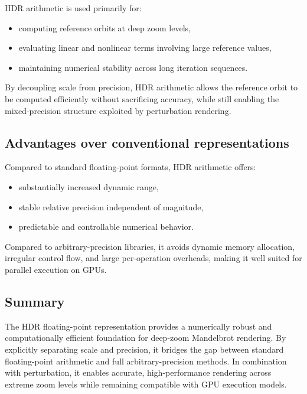 HDR arithmetic is used primarily for:
\begin{itemize}
\item computing reference orbits at deep zoom levels,
\item evaluating linear and nonlinear terms involving large reference values,
\item maintaining numerical stability across long iteration sequences.
\end{itemize}

By decoupling scale from precision, HDR arithmetic allows the reference orbit to
be computed efficiently without sacrificing accuracy, while still enabling the
mixed-precision structure exploited by perturbation rendering.

\subsection{Advantages over conventional representations}

Compared to standard floating-point formats, HDR arithmetic offers:
\begin{itemize}
\item substantially increased dynamic range,
\item stable relative precision independent of magnitude,
\item predictable and controllable numerical behavior.
\end{itemize}

Compared to arbitrary-precision libraries, it avoids dynamic memory allocation,
irregular control flow, and large per-operation overheads, making it well suited
for parallel execution on GPUs.

\subsection{Summary}

The HDR floating-point representation provides a numerically robust and
computationally efficient foundation for deep-zoom Mandelbrot rendering. By
explicitly separating scale and precision, it bridges the gap between standard
floating-point arithmetic and full arbitrary-precision methods. In combination
with perturbation, it enables accurate, high-performance rendering across
extreme zoom levels while remaining compatible with GPU execution models.


